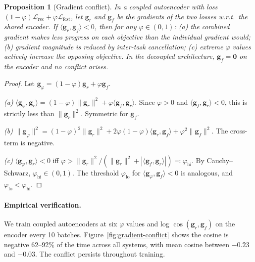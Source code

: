 \documentclass{article}
\newtheorem{proposition}{Proposition}
\begin{document}
\begin{proposition}[Gradient conflict]
\label{prop:gradient-conflict}
In a coupled autoencoder with loss
$(1{-}\varphi)\mathcal{L}_{\mathrm{rec}} +
\varphi\mathcal{L}_{\mathrm{fcst}}$,
let $\mathbf{g}_r$ and $\mathbf{g}_f$ be the gradients of the two
losses w.r.t.\ the shared encoder.  If
$\langle \mathbf{g}_r, \mathbf{g}_f \rangle < 0$, then for any
$\varphi \in (0,1)$: \emph{(a)} the combined gradient makes less
progress on each objective than the individual gradient would;
\emph{(b)} gradient magnitude is reduced by inter-task cancellation;
\emph{(c)} extreme $\varphi$ values actively increase the opposing
objective.
In the decoupled architecture, $\mathbf{g}_f = \mathbf{0}$ on the
encoder and no conflict arises.
\end{proposition}

\begin{proof}
Let $\mathbf{g}_\varphi = (1{-}\varphi)\mathbf{g}_r + \varphi\mathbf{g}_f$.

\emph{(a)}
$\langle \mathbf{g}_\varphi, \mathbf{g}_r \rangle
= (1{-}\varphi)\|\mathbf{g}_r\|^2 + \varphi\langle\mathbf{g}_f,\mathbf{g}_r\rangle$.
Since $\varphi > 0$ and
$\langle\mathbf{g}_f,\mathbf{g}_r\rangle < 0$,
this is strictly less than $\|\mathbf{g}_r\|^2$.
Symmetric for $\mathbf{g}_f$.

\emph{(b)}
$\|\mathbf{g}_\varphi\|^2
= (1{-}\varphi)^2\|\mathbf{g}_r\|^2
+ 2\varphi(1{-}\varphi)\langle\mathbf{g}_r,\mathbf{g}_f\rangle
+ \varphi^2\|\mathbf{g}_f\|^2$.
The cross-term is negative.

\emph{(c)}
$\langle\mathbf{g}_\varphi,\mathbf{g}_r\rangle < 0$
iff $\varphi > \|\mathbf{g}_r\|^2
/ (\|\mathbf{g}_r\|^2 + |\langle\mathbf{g}_f,\mathbf{g}_r\rangle|)
\eqqcolon \varphi_{\mathrm{hi}}$.
By Cauchy--Schwarz, $\varphi_{\mathrm{hi}} \in (0,1)$.
The threshold $\varphi_{\mathrm{lo}}$ for
$\langle\mathbf{g}_\varphi,\mathbf{g}_f\rangle < 0$ is analogous,
and $\varphi_{\mathrm{lo}} < \varphi_{\mathrm{hi}}$.
\end{proof}


\paragraph{Empirical verification.}
We train coupled autoencoders at six $\varphi$ values and log
$\cos(\mathbf{g}_r, \mathbf{g}_f)$ on the encoder every 10 batches.
Figure~\ref{fig:gradient-conflict} shows the cosine is negative
62--92\% of the time across all systems, with mean cosine between
$-0.23$ and $-0.03$.  The conflict persists throughout training.
\end{document}
